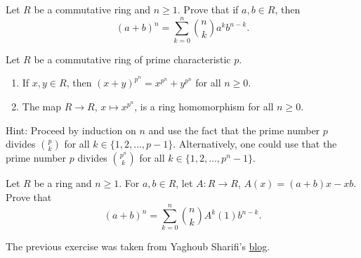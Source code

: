 \begin{exercise}
    Let $R$ be a commutative ring and $n\geq1$. Prove that
    if $a,b\in R$, then 
    \[
    (a+b)^n=\sum_{k=0}^n\binom{n}{k}a^kb^{n-k}.
    \]
\end{exercise}    

\begin{exercise}
\label{xca:freshman_dream}
    Let $R$ be a commutative ring of prime characteristic $p$. 
    \begin{enumerate}
        \item If $x,y\in R$, then $(x+y)^{p^n}=x^{p^n}+y^{p^n}$ for all $n\geq0$. 
        \item The map $R\to R$, $x\mapsto x^{p^n}$, is a ring homomorphism for all $n\geq0$.
    \end{enumerate}
\end{exercise}

Hint: Proceed by induction on $n$ and use the fact that the prime number $p$ divides 
$\binom{p}{k}$ for all $k\in\{1,2,\dots,p-1\}$. Alternatively, one could use
that the prime number $p$ divides $\binom{p^n}{k}$ for all 
$k\in\{1,2,\dots,p^n-1\}$. 

\begin{bonus}
    Let $R$ be a ring and $n\geq1$. 
    For $a,b\in R$, let $A\colon R\to R$, $A(x)=(a+b)x-xb$. 
    Prove that
    \[
    (a+b)^n=\sum_{k=0}^n\binom{n}{k}A^k(1)b^{n-k}.
    \] 
\end{bonus}

The previous exercise was taken from Yaghoub Sharifi's 
\href{https://ysharifi.wordpress.com}{blog}.


